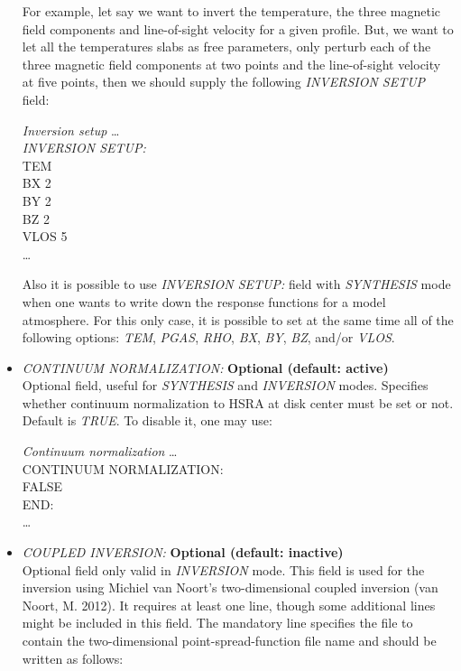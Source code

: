\begin{itemize}
  For example, let say we want to invert the temperature, the three magnetic field components and line-of-sight velocity for a given profile. But, we want to let all the temperatures slabs as free parameters, only perturb each of the three magnetic field components at two points and the line-of-sight velocity at five points, then we should supply the following {\it INVERSION SETUP} field: \\
\begin{ifbox}[label={tb:inversion_setup}]{{\it Inversion setup}}
  \scriptsize
  \ldots\\
  {\it INVERSION SETUP:}\\
  TEM\\
  BX   2\\
  BY   2\\
  BZ   2\\
  VLOS  5\\
  \ldots
  \normalsize
\end{ifbox}
  Also it is possible to use {\it INVERSION SETUP:} field with {\it SYNTHESIS} mode when one wants to write down the response functions for a model atmosphere. For this only case, it is possible to set at the same time all of the following options: {\it TEM}, {\it PGAS}, {\it RHO}, {\it BX}, {\it BY}, {\it BZ}, and/or {\it VLOS}.\\
  \item {\it CONTINUUM NORMALIZATION:} {\bf Optional (default: active)}\\
  Optional field, useful for {\it SYNTHESIS} and {\it INVERSION} modes. Specifies whether continuum normalization to HSRA at disk center must be set or not. Default is {\it TRUE}. To disable it, one may use:\\
\begin{ifbox}[label={tb:continuum_normalization}]{{\it Continuum normalization}}
  \scriptsize
  \ldots\\
  CONTINUUM NORMALIZATION:\\
  FALSE\\
  END:\\
  \ldots
  \normalsize
\end{ifbox}
  \item {\it COUPLED INVERSION:} {\bf Optional (default: inactive)}\\
  Optional field only valid in {\it INVERSION} mode. This field is used for the inversion using Michiel van Noort's two-dimensional coupled inversion (van Noort, M. 2012). It requires at least one line, though some additional lines might be included in this field. The mandatory line specifies the file to contain the two-dimensional point-spread-function file name and should be written as follows:\\

\end{itemize}
